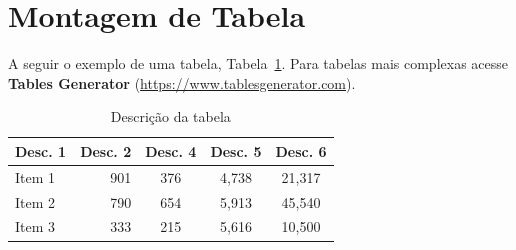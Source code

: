\section{Montagem de Tabela}
\label{sec:tabela}
A seguir o exemplo de uma tabela, Tabela~\ref{tab:tab_identificador}. Para tabelas mais complexas acesse \textbf{Tables Generator} (\href{https://www.tablesgenerator.com/}{https://www.tablesgenerator.com}).
\begin{table}[!ht]
	\centering
	\caption{Descrição da tabela}
	\label{tab:tab_identificador}
	\begin{tabular*}{\columnwidth}{@{\extracolsep{\fill}}lrccc@{}}
		\toprule[1pt]{}\textbf{Desc. 1} & \textbf{Desc. 2} & \textbf{Desc. 4} & \textbf{Desc. 5} & \textbf{Desc. 6}\\\hline
		Item 1		& 901     	& 376  	& 4,738 & 21,317	\\
		Item 2		& 790		& 654  	& 5,913 & 45,540	\\
		Item 3 		& 333		& 215  	& 5,616 & 10,500	\\
		\bottomrule[1pt]
	\end{tabular*}
	\raggedright
	 \\%
\end{table}



